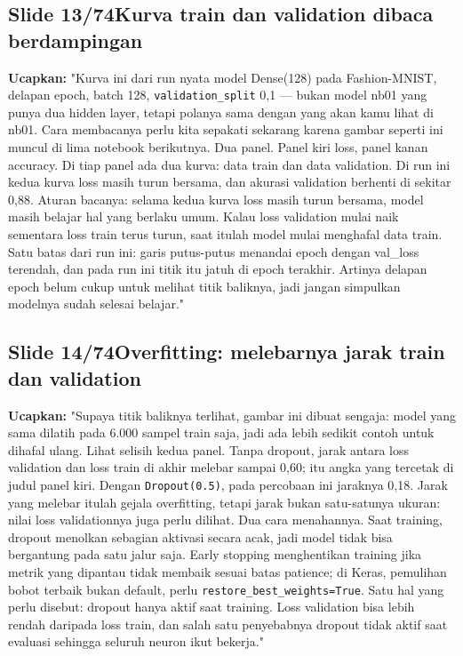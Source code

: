 \documentclass[11pt]{article}
\renewcommand{\framebox}[1]{\colorbox{acc!15}{\textcolor{acc}{\textbf{#1}}}}
\begin{document}
\subsection*{\framebox{Slide 13/74}\quad Kurva train dan validation dibaca berdampingan}
\textbf{Ucapkan:} "Kurva ini dari run nyata model Dense(128) pada Fashion-MNIST, delapan epoch, batch 128, \texttt{validation\_split} 0,1 — bukan model nb01 yang punya dua hidden layer, tetapi polanya sama dengan yang akan kamu lihat di nb01. Cara membacanya perlu kita sepakati sekarang karena gambar seperti ini muncul di lima notebook berikutnya. Dua panel. Panel kiri loss, panel kanan accuracy. Di tiap panel ada dua kurva: data train dan data validation. Di run ini kedua kurva loss masih turun bersama, dan akurasi validation berhenti di sekitar 0,88. Aturan bacanya: selama kedua kurva loss masih turun bersama, model masih belajar hal yang berlaku umum. Kalau loss validation mulai naik sementara loss train terus turun, saat itulah model mulai menghafal data train. Satu batas dari run ini: garis putus-putus menandai epoch dengan val\_loss terendah, dan pada run ini titik itu jatuh di epoch terakhir. Artinya delapan epoch belum cukup untuk melihat titik baliknya, jadi jangan simpulkan modelnya sudah selesai belajar."\\[2pt]

\subsection*{\framebox{Slide 14/74}\quad Overfitting: melebarnya jarak train dan validation}
\textbf{Ucapkan:} "Supaya titik baliknya terlihat, gambar ini dibuat sengaja: model yang sama dilatih pada 6.000 sampel train saja, jadi ada lebih sedikit contoh untuk dihafal ulang. Lihat selisih kedua panel. Tanpa dropout, jarak antara loss validation dan loss train di akhir melebar sampai 0,60; itu angka yang tercetak di judul panel kiri. Dengan \texttt{Dropout(0.5)}, pada percobaan ini jaraknya 0,18. Jarak yang melebar itulah gejala overfitting, tetapi jarak bukan satu-satunya ukuran: nilai loss validationnya juga perlu dilihat. Dua cara menahannya. Saat training, dropout menolkan sebagian aktivasi secara acak, jadi model tidak bisa bergantung pada satu jalur saja. Early stopping menghentikan training jika metrik yang dipantau tidak membaik sesuai batas patience; di Keras, pemulihan bobot terbaik bukan default, perlu \texttt{restore\_best\_weights=True}. Satu hal yang perlu disebut: dropout hanya aktif saat training. Loss validation bisa lebih rendah daripada loss train, dan salah satu penyebabnya dropout tidak aktif saat evaluasi sehingga seluruh neuron ikut bekerja."\\[2pt]
\end{document}
